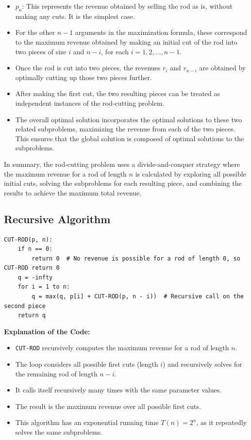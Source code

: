 \begin{itemize}
    \item \( p_n \): This represents the revenue obtained by selling the rod as is, without making any cuts. It is the simplest case.
    \item For the other \( n-1 \) arguments in the maximization formula, these correspond to the maximum revenue obtained by making an initial cut of the rod into two pieces of size \( i \) and \( n-i \), for each \( i = 1, 2, \dots, n-1 \).
    \item Once the rod is cut into two pieces, the revenues \( r_i \) and \( r_{n-i} \) are obtained by optimally cutting up those two pieces further.
    \item After making the first cut, the two resulting pieces can be treated as independent instances of the rod-cutting problem.
    \item The overall optimal solution incorporates the optimal solutions to these two related subproblems, maximizing the revenue from each of the two pieces. This ensures that the global solution is composed of optimal solutions to the subproblems.
\end{itemize}
In summary, the rod-cutting problem uses a divide-and-conquer strategy where the maximum revenue for a rod of length \( n \) is calculated by exploring all possible initial cuts, solving the subproblems for each resulting piece, and combining the results to achieve the maximum total revenue.

\subsection{Recursive Algorithm}

\begin{verbatim}
CUT-ROD(p, n):
    if n == 0:
        return 0  # No revenue is possible for a rod of length 0, so CUT-ROD return 0
    q = -infty
    for i = 1 to n:
        q = max(q, p[i] + CUT-ROD(p, n - i))  # Recursive call on the second piece
    return q
\end{verbatim}

\textbf{Explanation of the Code:}
\begin{itemize}
    \item \texttt{CUT-ROD} recursively computes the maximum revenue for a rod of length \(n\).
    \item The loop considers all possible first cuts (length \(i\)) and recursively solves for the remaining rod of length \(n-i\).
    \item It calls itself recursively many times with the same parameter values. 
    \item The result is the maximum revenue over all possible first cuts.
    \item This algorithm has an exponential running time \(T(n) = 2^n\), as it repeatedly solves the same subproblems.
\end{itemize}

